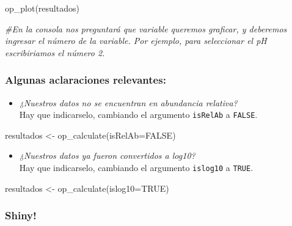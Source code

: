 \documentclass[
]{book}
\newenvironment{Shaded}{\begin{snugshade}}{\end{snugshade}}
\newcommand{\AttributeTok}[1]{\textcolor[rgb]{0.77,0.63,0.00}{#1}}
\newcommand{\CommentTok}[1]{\textcolor[rgb]{0.56,0.35,0.01}{\textit{#1}}}
\newcommand{\ConstantTok}[1]{\textcolor[rgb]{0.00,0.00,0.00}{#1}}
\newcommand{\FunctionTok}[1]{\textcolor[rgb]{0.00,0.00,0.00}{#1}}
\newcommand{\NormalTok}[1]{#1}
\newcommand{\OtherTok}[1]{\textcolor[rgb]{0.56,0.35,0.01}{#1}}
\providecommand{\tightlist}{%
  \setlength{\itemsep}{0pt}\setlength{\parskip}{0pt}}
\begin{document}
\begin{Shaded}
\begin{Highlighting}[]
\FunctionTok{op\_plot}\NormalTok{(resultados)}

\CommentTok{\#En la consola nos preguntará que variable queremos graficar, y deberemos ingresar el número de la variable. Por ejemplo, para seleccionar el pH escribiriamos el número 2.}
\end{Highlighting}
\end{Shaded}

\hypertarget{algunas-aclaraciones-relevantes-1}{%
\subsubsection{\texorpdfstring{\textbf{Algunas aclaraciones relevantes:}}{Algunas aclaraciones relevantes:}}\label{algunas-aclaraciones-relevantes-1}}

\begin{itemize}
\tightlist
\item
  \emph{¿Nuestros datos no se encuentran en abundancia relativa?}\\
  Hay que indicarselo, cambiando el argumento \texttt{isRelAb} a \texttt{FALSE}.
\end{itemize}

\begin{Shaded}
\begin{Highlighting}[]
\NormalTok{resultados }\OtherTok{\textless{}{-}} \FunctionTok{op\_calculate}\NormalTok{(}\AttributeTok{isRelAb=}\ConstantTok{FALSE}\NormalTok{)}
\end{Highlighting}
\end{Shaded}

\begin{itemize}
\tightlist
\item
  \emph{¿Nuestros datos ya fueron convertidos a log10?}\\
  Hay que indicarselo, cambiando el argumento \texttt{islog10} a \texttt{TRUE}.
\end{itemize}

\begin{Shaded}
\begin{Highlighting}[]
\NormalTok{resultados }\OtherTok{\textless{}{-}} \FunctionTok{op\_calculate}\NormalTok{(}\AttributeTok{islog10=}\ConstantTok{TRUE}\NormalTok{)}
\end{Highlighting}
\end{Shaded}

\hypertarget{shiny-1}{%
\subsubsection{Shiny!}\label{shiny-1}}
\end{document}
